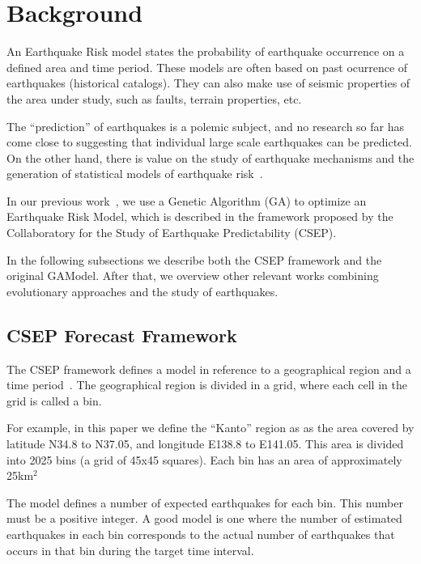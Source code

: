 \section{Background}
\label{sec:background}

An Earthquake Risk model states the probability of earthquake
occurrence on a defined area and time period. These models are often
based on past ocurrence of earthquakes (historical catalogs).  They
can also make use of seismic properties of the area under study, such
as faults, terrain properties, etc.

The ``prediction'' of earthquakes is a polemic subject, and no
research so far has come close to suggesting that individual large
scale earthquakes can be predicted. On the other hand, there is value
on the study of earthquake mechanisms and the generation of
statistical models of earthquake risk~\cite{Nature1999}.

In our previous work~\cite{ecta14}, we use a Genetic Algorithm (GA) to
optimize an Earthquake Risk Model, which is described in the framework
proposed by the Collaboratory for the Study of Earthquake
Predictability (CSEP).

In the following subsections we describe both the CSEP framework and
the original GAModel. After that, we overview other relevant works
combining evolutionary approaches and the study of earthquakes.

\subsection{CSEP Forecast Framework}

The CSEP framework defines a model in reference to a geographical
region and a time period~\cite{zechar2010evaluating}. The geographical
region is divided in a grid, where each cell in the grid is called a
bin.

For example, in this paper we define the “Kanto” region as as the area
covered by latitude N34.8 to N37.05, and longitude E138.8 to
E141.05. This area is divided into 2025 bins (a grid of 45x45
squares).  Each bin has an area of approximately 25km$^2$

The model defines a number of expected earthquakes for each bin.  This
number must be a positive integer. A good model is one where the
number of estimated earthquakes in each bin corresponds to the actual
number of earthquakes that occurs in that bin during the target time
interval.


